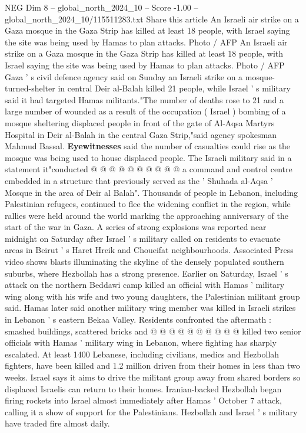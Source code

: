 \begin{textsample}{NEG Dim 8 – global\_north\_2024\_10 – Score -1.00 – global\_north\_2024\_10/115511283.txt}  \label{ex:f8_neg_293}
Share this article An Israeli air strike on a Gaza mosque in the Gaza Strip has killed at least 18 people, with Israel saying the site was being used by Hamas to plan attacks.
Photo / AFP An Israeli air strike on a Gaza mosque in the Gaza Strip has killed at least 18 people, with Israel saying the site was being used by Hamas to plan attacks.
Photo / AFP Gaza ' s civil defence agency said on Sunday an Israeli strike on a mosque-turned-shelter in central Deir al-Balah killed 21 people, while Israel ' s military said it had targeted Hamas militants."The number of deaths rose to 21 and a large number of wounded as a result of the occupation ( Israel ) bombing of a mosque sheltering displaced people in front of the gate of Al-Aqsa Martyrs Hospital in Deir al-Balah in the central Gaza Strip,"said agency spokesman Mahmud Bassal. \textbf{Eyewitnesses} said the number of casualties could rise as the mosque was being used to house displaced people.
The Israeli military said in a statement it"conducted @ @ @ @ @ @ @ @ @ @ a command and control centre embedded in a structure that previously served as the ' Shuhada al-Aqsa ' Mosque in the area of Deir al Balah".
Thousands of people in Lebanon, including Palestinian refugees, continued to flee the widening conflict in the region, while rallies were held around the world marking the approaching anniversary of the start of the war in Gaza.
A series of strong explosions was reported near midnight on Saturday after Israel ' s military called on residents to evacuate areas in Beirut ' s Haret Hreik and Choueifat neighbourhoods.
Associated Press video shows blasts illuminating the skyline of the densely populated southern suburbs, where Hezbollah has a strong presence.
Earlier on Saturday, Israel ' s attack on the northern Beddawi camp killed an official with Hamas ' military wing along with his wife and two young daughters, the Palestinian militant group said.
Hamas later said another military wing member was killed in Israeli strikes in Lebanon ' s eastern Bekaa Valley.
Residents confronted the aftermath : smashed buildings, scattered bricks and @ @ @ @ @ @ @ @ @ @ killed two senior officials with Hamas ' military wing in Lebanon, where fighting has sharply escalated.
At least 1400 Lebanese, including civilians, medics and Hezbollah fighters, have been killed and 1.2 million driven from their homes in less than two weeks.
Israel says it aims to drive the militant group away from shared borders so displaced Israelis can return to their homes.
Iranian-backed Hezbollah began firing rockets into Israel almost immediately after Hamas ' October 7 attack, calling it a show of support for the Palestinians.
Hezbollah and Israel ' s military have traded fire almost daily.

\end{textsample}
